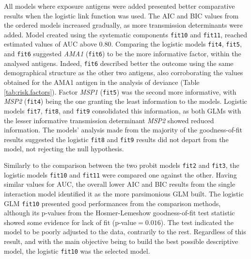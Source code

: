All models where exposure antigens were added presented better comparative results when the logistic link function was used.
The AIC and BIC values from the ordered models increased gradually, as more transmission determinants were added.
Model created using the systematic components \texttt{fit10} and \texttt{fit11}, reached estimated values of AUC above 0.80.
Comparing the logistic models \texttt{fit4}, \texttt{fit5}, and \texttt{fit6} suggested \textit{AMA1} (\texttt{fit6}) to be the more informative factor, within the analysed antigens.
Indeed, \texttt{fit6} described better the outcome using the same demographical structure as the other two antigens, also corroborating the values obtained for the AMA1 antigen in the analysis of deviance (Table \ref{tab:risk.factors}).
Factor \textit{MSP1} (\texttt{fit5}) was the second more informative, with \textit{MSP2} (\texttt{fit4}) being the one granting the least information to the models.
Logistic models \texttt{fit7}, \texttt{fit8}, and \texttt{fit9} consolidated this information, as both GLMs with the lesser informative transmission determinant \textit{MSP2} showed reduced information.
The models' analysis made from the majority of the goodness-of-fit results suggested the logistic \texttt{fit8} and \texttt{fit9} results did not depart from the model, not rejecting the null hypothesis.

Similarly to the comparison between the two probit models \texttt{fit2} and \texttt{fit3}, the logistic models \texttt{fit10} and \texttt{fit11} were compared one against the other.
Having similar values for AUC, the overall lower AIC and BIC results from the single interaction model identified it as the more parsimonious GLM built.
The logistic GLM \texttt{fit10} presented good performances from the comparison methods, although its p-values from the Hosmer-Lemeshow goodness-of-fit test statistic showed some evidence for lack of fit (p-value$=0.016$).
The test indicated the model to be poorly adjusted to the data, contrarily to the rest.
Regardless of this result, and with the main objective being to build the best possible descriptive model, the logistic \texttt{fit10} was the selected model.

